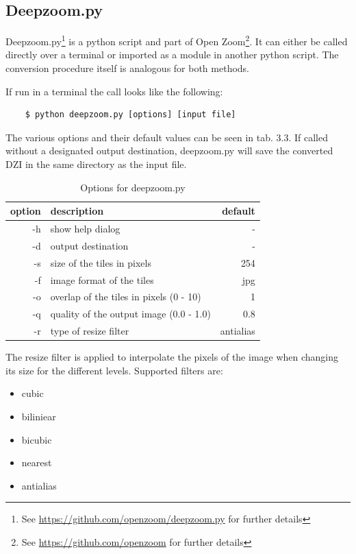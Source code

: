 \subsection{Deepzoom.py}

Deepzoom.py\footnote{See \url{https://github.com/openzoom/deepzoom.py} for further details} is a python script and part of Open Zoom\footnote{See \url{https://github.com/openzoom} for further details}. It can either be called directly over a terminal or imported as a module in another python script. The conversion procedure itself is analogous for both methods.

If run in a terminal the call looks like the following:

\begin{lstlisting}
	$ python deepzoom.py [options] [input file]
\end{lstlisting}

The various options and their default values can be seen in tab. 3.3. If called without a designated output destination, deepzoom.py will save the converted DZI in the same directory as the input file.

\begin{table}[H]
	\begin{center}
		\begin{tabular}{| r | l | r |}
			\hline
			\textbf{option} & \textbf{description} & \textbf{default} \\ \hline
			-h & show help dialog & - \\ \hline
			-d & output destination & - \\ \hline
			-s & size of the tiles in pixels & 254 \\ \hline
			-f & image format of the tiles & jpg\\ \hline
			-o & overlap of the tiles in pixels (0 - 10) & 1 \\ \hline
			-q & quality of the output image (0.0 - 1.0) & 0.8 \\ \hline
			-r & type of resize filter & antialias \\ \hline
		\end{tabular}
		\caption{Options for deepzoom.py}
		\label{tab3.3}
	\end{center}
\end{table}

The resize filter is applied to interpolate the pixels of the image when changing its size for the different levels. Supported filters are:

\begin{itemize}
	\item cubic
	\item biliniear
	\item bicubic
	\item nearest
	\item antialias
\end{itemize}

